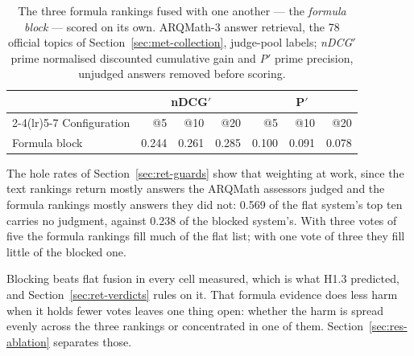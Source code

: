 \begin{table}[!ht]
\centering
\small
\renewcommand{\arraystretch}{1.15}
\begin{tabular}{lrrrrrr}
\toprule
& \multicolumn{3}{c}{nDCG$'$} & \multicolumn{3}{c}{P$'$} \\
\cmidrule(lr){2-4}\cmidrule(lr){5-7}
Configuration & @5 & @10 & @20 & @5 & @10 & @20 \\
\midrule
Formula block & 0.244 & 0.261 & 0.285 & 0.100 & 0.091 & 0.078 \\
\bottomrule
\end{tabular}
\caption[The three formula rankings fused]{The three formula rankings fused with one another --- the \emph{formula block} ---
scored on its own. ARQMath-3 answer retrieval, the 78 official topics of
Section~\ref{sec:met-collection}, judge-pool labels; \emph{nDCG$'$} prime normalised discounted
cumulative gain and \emph{P$'$} prime precision, unjudged answers removed before scoring.}
\label{tab:res-formula-block}
\end{table}

The hole rates of Section~\ref{sec:ret-guards} show that weighting at work, since the text rankings return mostly answers the ARQMath assessors judged and the formula
rankings mostly answers they did not: 0.569 of the flat system's top ten carries no judgment,
against 0.238 of the blocked system's. With three votes of five the formula rankings fill much of
the flat list; with one vote of three they fill little of the blocked one.

Blocking beats flat fusion in every cell measured, which is what H1.3 predicted, and
Section~\ref{sec:ret-verdicts} rules on it. That formula evidence does less harm when it holds
fewer votes leaves one thing open: whether the harm is spread evenly across the three rankings
or concentrated in one of them. Section~\ref{sec:res-ablation} separates those.

